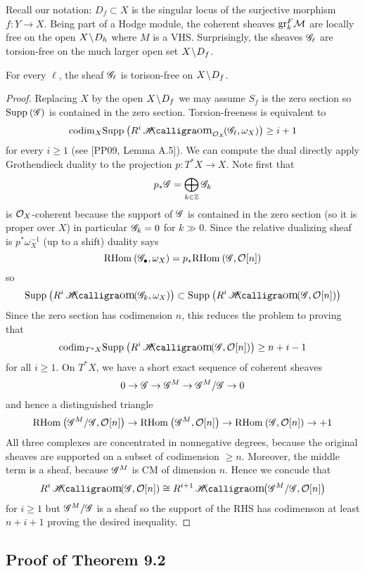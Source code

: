 \documentclass[12pt]{article}
\renewcommand{\gr}{\mathrm{gr}}
\newcommand{\cO}{\mathcal{O}}
\renewcommand{\codim}{\mathrm{codim}}
\begin{document}
Recall our notation: $D_f \subset X$ is the singular locus of the surjective morphism $f : Y \to X$. Being part of a Hodge module, the coherent sheaves $\gr^F_k \cM$ are locally free on the open $X \! \setminus \! D_h$ where $M$ is a VHS. Surprisingly, the sheaves $\mathscr{G}_\ell$ are torsion-free on the much larger open set $X \! \setminus \! D_f$.

\begin{prop}
For every $\ell$, the sheaf $\mathscr{G}_\ell$ is torison-free on $X \! \setminus \! D_f$.
\end{prop}

\begin{proof}
Replacing $X$ by the open $X \! \setminus \! D_f$ we may assume $S_f$ is the zero section so $\mathrm{Supp}_{}\left(\mathscr{G} \right)$ is contained in the zero section. Torsion-freeness is equivalent to 
\[ \codim_X \Supp{}{R^i \shHom{\struct{X}}{\G_\ell}{\omega_X}} \ge i + 1 \]
for every $i \ge 1$ (see [PP09, Lemma A.5]). We can compute the dual directly apply Grothendieck duality to the projection $p : T^* X \to X$. Note first that
\[ p_* \mathscr{G} = \bigoplus_{k \in \mathbb{Z}} \mathscr{G}_k \]
is $\mathcal{O}_{X}$-coherent because the support of $\mathscr{G}$ is contained in the zero section (so it is proper over $X$) in particular $\mathscr{G}_k = 0$ for $k \gg 0$. Since the relative dualizing sheaf is $p^* \omega_X^{-1}$ (up to a shift) duality says
\[ \mathrm{RHom}_{} \left( \mathscr{G}_\bullet, \omega_X \right) = p_* \mathrm{RHom}_{} \left( \mathscr{G}, \mathcal{O}_{}[n] \right) \]
so 
\[ \Supp{}{R^i \shHom{}{\G_k}{\omega_X}} \subset \Supp{}{R^i \shHom{}{\G}{\struct{}[n]}} \]
Since the zero section has codimension $n$, this reduces the problem to proving that
\[ \codim_{T^* X} \Supp{}{R^i \shHom{}{\G}{\struct{}[n]}} \ge n + i - 1 \]
for all $i \ge 1$. On $T^* X$, we have a short exact sequence of coherent sheaves
\[ 0 \to \mathscr{G} \to \mathscr{G}^M \to \mathscr{G}^M / \mathscr{G} \to 0 \]
and hence a distinguished triangle
\[ \RHom{}{\G^M/\G}{\struct{}[n]} \to \RHom{}{\G^M}{\cO[n]} \to \RHom{}{\G}{\cO[n]} \to +1 \]
All three complexes are concentrated in nonnegative degrees, because the original sheaves are supported on a subset of codimension $\ge n$. Moreover, the middle term is a sheaf, because $\mathscr{G}^M$ is CM of dimension $n$. Hence we concude that
\[ R^i \shHom{}{\G}{\cO[n]} \cong R^{i+1} \shHom{}{\G^M/\G}{\cO[n]} \]
for $i \ge 1$ but $\mathscr{G}^M / \mathscr{G}$ is a sheaf so the support of the RHS has codimenson at least $n + i + 1$ proving the desired inequality. 
\end{proof}

\subsection{Proof of Theorem 9.2}
\end{document}
